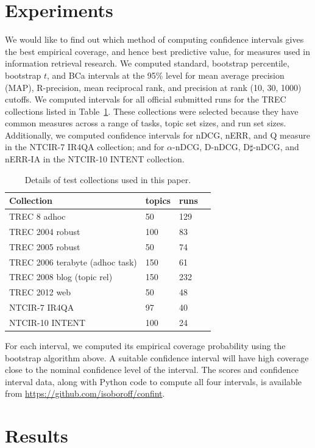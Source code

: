 \documentclass{sig-alt-release-2013}
\begin{document}
\section{Experiments}

We would like to find out which method of computing confidence intervals gives the best empirical coverage, and hence best predictive value, for measures used in information retrieval research.  We computed standard, bootstrap percentile, bootstrap $t$, and BCa intervals at the 95\% level for mean average precision (MAP), R-precision, mean reciprocal rank, and precision at rank (10, 30, 1000) cutoffs.  We computed intervals for all official submitted runs for the TREC collections listed in Table~\ref{tab1}.  These collections were selected because they have common measures across a range of tasks, topic set sizes, and run set sizes.  Additionally, we computed confidence intervals for nDCG, nERR, and Q measure in the NTCIR-7 IR4QA collection; and for $\alpha$-nDCG, D-nDCG, D$\sharp$-nDCG, and nERR-IA in the NTCIR-10 INTENT collection.

\begin{table}
\begin{tabular}{l|lll}
Collection & topics & runs \\ \hline
TREC 8 adhoc & 50 & 129 \\
TREC 2004 robust & 100 & 83 \\
TREC 2005 robust & 50 & 74 \\
TREC 2006 terabyte (adhoc task) & 150 & 61 \\
TREC 2008 blog (topic rel) & 150 & 232 \\
TREC 2012 web & 50 & 48 \\
NTCIR-7 IR4QA & 97 & 40 \\
NTCIR-10 INTENT & 100 & 24 \\
\end{tabular}
\caption{\label{tab1}Details of test collections used in this paper.}
\end{table}

For each interval, we computed its empirical coverage probability using the bootstrap algorithm above.  A suitable confidence interval will have high coverage close to the nominal confidence level of the interval.  The scores and confidence interval data, along with Python code to compute all four intervals, is available from \url{https://github.com/isoboroff/confint}.

\section{Results}
\end{document}
